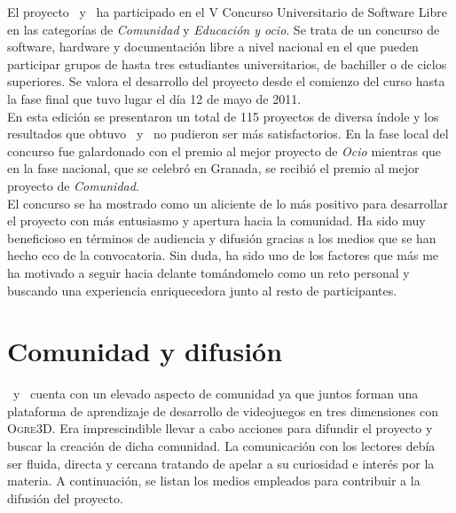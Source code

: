 \documentclass[a4paper,11pt]{article}
\begin{document}
\noindent El proyecto \wiki\ y \juego\ ha participado en el V Concurso Universitario
de Software Libre \cite{website:cusl} en las categorías de \textit{Comunidad} y \textit{Educación y ocio}.
Se trata de un concurso de software, hardware y documentación libre a nivel
nacional en el que pueden participar grupos de hasta tres estudiantes universitarios,
de bachiller o de ciclos superiores. Se valora el desarrollo del proyecto
desde el comienzo del curso hasta la fase final que tuvo lugar el día
12 de mayo de 2011.\\

\noindent En esta edición se presentaron un total de 115 proyectos de diversa índole
y los resultados que obtuvo \wiki\ y \juego\ no pudieron ser más satisfactorios.
En la fase local del concurso fue galardonado con el premio al mejor
proyecto de \textit{Ocio} mientras que en la fase nacional, que se celebró en Granada,
se recibió el premio al mejor proyecto de \textit{Comunidad}.\\

\noindent El concurso se ha mostrado como un aliciente de lo más positivo para desarrollar
el proyecto con más entusiasmo y apertura hacia la comunidad. Ha sido muy
beneficioso en términos de audiencia y difusión gracias a los medios
que se han hecho eco de la convocatoria. Sin duda, ha sido uno de los
factores que más me ha motivado a seguir hacia delante tomándomelo como un
reto personal y buscando una experiencia enriquecedora junto al resto
de participantes.\\


\section{Comunidad y difusión}

\noindent \wiki\ y \juego\ cuenta con un elevado aspecto de comunidad ya que juntos
forman una plataforma de aprendizaje de desarrollo de videojuegos en tres
dimensiones con \textsc{Ogre3D}. Era imprescindible llevar a cabo acciones
para difundir el proyecto y buscar la creación de dicha comunidad. La comunicación
con los lectores debía ser fluida, directa y cercana tratando de apelar
a su curiosidad e interés por la materia. A continuación, se listan los medios
empleados para contribuir a la difusión del proyecto.\\
\end{document}
